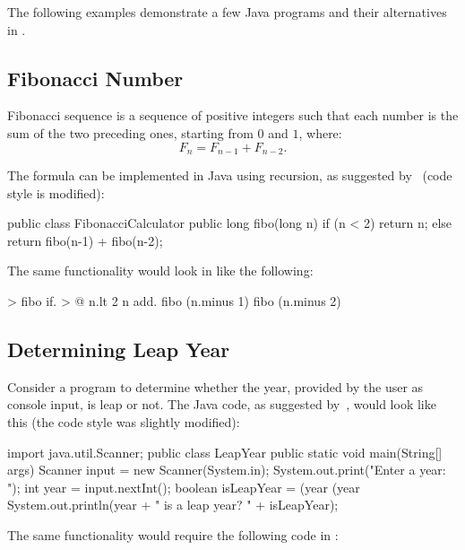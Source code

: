 The following examples demonstrate a few Java programs and their alternatives
in \eo{}.

\subsection{Fibonacci Number}

Fibonacci sequence is a sequence of positive integers such that
each number is the sum of the two preceding ones, starting from $0$ and $1$, where:
\begin{equation*}
F_n = F_{n-1} + F_{n-2}.
\end{equation*}

The formula can be implemented in Java using recursion, as suggested
by~\citet[p.743]{deitel2007java} (code style is modified):

\begin{ffcode}
public class FibonacciCalculator {
  public long fibo(long n) {
    if (n < 2) {
      return n;
    } else {
      return fibo(n-1) + fibo(n-2);
    }
  }
}
\end{ffcode}

The same functionality would look in \eo{} like the following:

\begin{ffcode}
[n] > fibo
  if. > @
    n.lt 2
    n
    add.
      fibo (n.minus 1)
      fibo (n.minus 2)
\end{ffcode}

\subsection{Determining Leap Year}

Consider a program to determine whether the year, provided
by the user as console input, is leap or not. The Java code,
as suggested by~\citet[pp.105--106]{liang2012}, would look like this
(the code style was slightly modified):

\begin{ffcode}
import java.util.Scanner;
public class LeapYear {
  public static void main(String[] args) {
    Scanner input = new Scanner(System.in);
    System.out.print("Enter a year: ");
    int year = input.nextInt();
    boolean isLeapYear =
      (year %
      (year %
    System.out.println(year +
      " is a leap year? " + isLeapYear);
  }
}
\end{ffcode}

The same functionality would require the following code in \eo{}:

